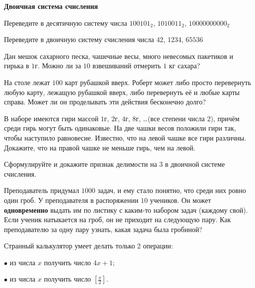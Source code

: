 \documentclass{article}
\begin{document}
    \large

    \begin{center}
        \textbf{Двоичная система счисления}
    \end{center}

    \begin{enumerate_boxed}
        \item Переведите в десятичную систему числа $100101_2$, $1010011_2$, $10000000000_2$

        \item Переведите в двоичную систему счисления числа $42$, $1234$, $65536$

        \item Дан мешок сахарного песка, чашечные весы, много невесомых пакетиков и гирька в $1$г. Можно ли за $10$ взвешиваний отмерить $1$ кг сахара?

        \item На столе лежат $100$ карт рубашкой вверх.
        Роберт может либо просто перевернуть любую карту, лежащую рубашкой вверх, либо перевернуть её и любые карты справа.
        Может ли он проделывать эти действия бесконечно долго?

        \item В наборе имеются гири массой $1$г, $2$г, $4$г, $8$г, \ldots (все степени числа $2$), причём среди гирь могут быть одинаковые.
        На две чашки весов положили гири так, чтобы наступило равновесие.
        Известно, что на левой чашке все гири различны.
        Докажите, что на правой чашке не меньше гирь, чем на левой.

        \item Сформулируйте и докажите признак делимости на $3$ в двоичной системе счисления.

        \item Преподаватель придумал $1000$ задач, и ему стало понятно, что среди них ровно один гроб.
        У преподавателя в распоряжении $10$ учеников.
        Он может \textbf{одновременно} выдать им по листику с каким-то набором задач (каждому свой).
        Если ученик натыкается на гроб, он не приходит на следующую пару.
        Как преподавателю за одну пару узнать, какая задача была гробиной?

        \item Странный калькулятор умеет делать только 2 операции:

        $\bullet$ из числа $x$ получить число $4x+1$;

        $\bullet$ из числа $x$ получить число $\left[\frac{x}{2}\right]$.


\end{enumerate_boxed}
\end{document}
